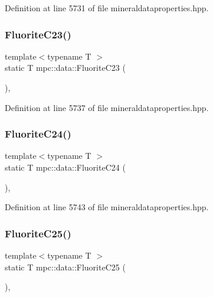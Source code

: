 Definition at line 5731 of file mineraldataproperties.\+hpp.

\mbox{\label{namespacempc_1_1data_af0554787559be379a6e539a2fa1786bb}} 
\subsubsection{\texorpdfstring{Fluorite\+C23()}{FluoriteC23()}}
{\footnotesize\ttfamily template$<$typename T $>$ \\
static T mpc\+::data\+::\+Fluorite\+C23 (\begin{DoxyParamCaption}{ }\end{DoxyParamCaption})\hspace{0.3cm}{\ttfamily [inline]}, {\ttfamily [static]}}



Definition at line 5737 of file mineraldataproperties.\+hpp.

\mbox{\label{namespacempc_1_1data_a2895ec2baf206f55b15eedc4086569be}} 
\subsubsection{\texorpdfstring{Fluorite\+C24()}{FluoriteC24()}}
{\footnotesize\ttfamily template$<$typename T $>$ \\
static T mpc\+::data\+::\+Fluorite\+C24 (\begin{DoxyParamCaption}{ }\end{DoxyParamCaption})\hspace{0.3cm}{\ttfamily [inline]}, {\ttfamily [static]}}



Definition at line 5743 of file mineraldataproperties.\+hpp.

\mbox{\label{namespacempc_1_1data_aa49cbd913f61fd76806da17a84b3a66c}} 
\subsubsection{\texorpdfstring{Fluorite\+C25()}{FluoriteC25()}}
{\footnotesize\ttfamily template$<$typename T $>$ \\
static T mpc\+::data\+::\+Fluorite\+C25 (\begin{DoxyParamCaption}{ }\end{DoxyParamCaption})\hspace{0.3cm}{\ttfamily [inline]}, {\ttfamily [static]}}



